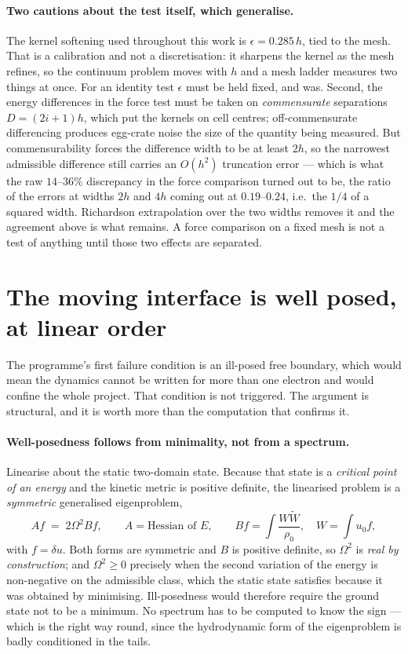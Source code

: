 \documentclass[11pt]{article}
\begin{document}
\paragraph{Two cautions about the test itself, which generalise.} The kernel softening used
throughout this work is $\epsilon = 0.285\,h$, tied to the mesh. That is a calibration and not a
discretisation: it sharpens the kernel as the mesh refines, so the continuum problem moves with $h$
and a mesh ladder measures two things at once. For an identity test $\epsilon$ must be held fixed,
and was. Second, the energy differences in the force test must be taken on \emph{commensurate}
separations $D=(2i+1)h$, which put the kernels on cell centres; off-commensurate differencing
produces egg-crate noise the size of the quantity being measured. But commensurability forces the
difference width to be at least $2h$, so the narrowest admissible difference still carries an
$O(h^2)$ truncation error --- which is what the raw $14$--$36\%$ discrepancy in the force comparison
turned out to be, the ratio of the errors at widths $2h$ and $4h$ coming out at $0.19$--$0.24$,
i.e.\ the $1/4$ of a squared width. Richardson extrapolation over the two widths removes it and the
agreement above is what remains. A force comparison on a fixed mesh is not a test of anything until
those two effects are separated.

\section{The moving interface is well posed, at linear order}\label{sec:phase3}

The programme's first failure condition is an ill-posed free boundary, which would mean the dynamics
cannot be written for more than one electron and would confine the whole project. That condition is
not triggered. The argument is structural, and it is worth more than the computation that confirms
it.

\paragraph{Well-posedness follows from minimality, not from a spectrum.} Linearise about the static
two-domain state. Because that state is a \emph{critical point of an energy} and the kinetic metric
is positive definite, the linearised problem is a \emph{symmetric} generalised eigenproblem,
\begin{equation}\label{eq:gep}
A f \;=\; 2\Omega^2 B f,\qquad
A=\text{Hessian of } E,\qquad
Bf=\int\frac{W\widetilde W}{\rho_0},\quad W=\int u_0 f ,
\end{equation}
with $f=\delta u$. Both forms are symmetric and $B$ is positive definite, so $\Omega^2$ is
\emph{real by construction}; and $\Omega^2\ge0$ precisely when the second variation of the energy is
non-negative on the admissible class, which the static state satisfies because it was obtained by
minimising. Ill-posedness would therefore require the ground state not to be a minimum. No spectrum
has to be computed to know the sign --- which is the right way round, since the hydrodynamic form of
the eigenproblem is badly conditioned in the tails.
\end{document}
